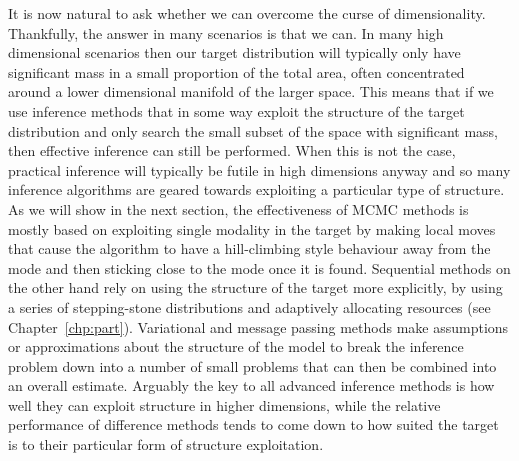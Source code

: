 It is now natural to ask whether we can overcome the curse of dimensionality.  Thankfully, the
answer in many scenarios is that we can.  In many high dimensional scenarios then our target
distribution will typically only have significant mass in a small proportion of the total area, often
concentrated around a lower dimensional manifold of the larger space.  This means that if
we use inference methods that in some way exploit the structure of the target distribution and only
search the small subset of the space with significant mass, then effective inference can still be
performed.  When this is not the case, practical inference will typically be futile in high dimensions anyway
and so many inference algorithms are geared towards exploiting a particular type of structure.
As we will show in the next section, the effectiveness of MCMC methods is mostly based on 
exploiting single modality in the target by making local moves that cause the algorithm to have a
hill-climbing style behaviour away from the mode and then sticking close to the mode once it
is found.  Sequential \mc methods on the other hand rely on using the structure of the target
more explicitly, by using a series of stepping-stone distributions and adaptively allocating
resources (see Chapter~\ref{chp:part}).  Variational and message passing methods make assumptions
or approximations about the structure of the model to break the inference problem down
into a number of small problems that can then be combined into an overall estimate.
Arguably the key to all advanced inference methods is how well they can exploit structure
in higher dimensions, while the relative performance of difference methods tends to come down
to how suited the target is to their particular form of structure exploitation.